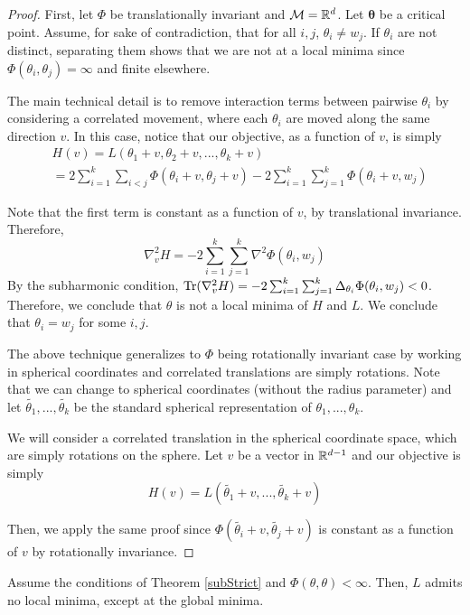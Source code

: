 \begin{proof}
First, let $\Phi$ be translationally invariant and $\mathcal{M} =
{\mathbb{R}}^d$. Let $\boldsymbol{\theta}$ be a critical point. Assume, for sake
of contradiction, that for all $i, j$, $\theta_i \neq w_j$. If
$\theta_i$ are not distinct, separating them shows that
we are not at a local minima since $\Phi(\theta_i,\theta_j) = \infty$
and finite elsewhere. 

The main technical detail is to remove interaction terms between
pairwise $\theta_i$ by considering a correlated movement, where each
$\theta_i$ are moved along the same direction $v$. In this case,
notice that our objective, as a function of $v$, is simply
\begin{align*}
& H(v) = L(\theta_1+ v, \theta_2 + v, ...,\theta_k + v) \\
& =  2\sum_{i=1}^k\sum_{i < j} \Phi(\theta_i+v,\theta_j+v) -
  2\sum_{i=1}^k\sum_{j=1}^k \Phi(\theta_i+v,w_j)
\end{align*}

Note that the first term is constant as a function of $v$, by
translational invariance. Therefore,
\[\nabla_{v}^2 H = -2\sum_{i=1}^k \sum_{j=1}^k \nabla^2\Phi(\theta_i, w_j)\]
By the subharmonic condition,
$\operatorname{Tr}(\nabla_{v}^2H) = -2\sum_{i=1}^k\sum_{j=1}^k
\Delta_{\theta_i}\Phi(\theta_i,w_j) < 0$.
Therefore, we conclude that $\theta$ is not a local minima of $H$ and
$L$.  We conclude that $\theta_i = w_j$ for some $i, j$.

The above technique generalizes to $\Phi$ being rotationally invariant
case by working in spherical coordinates and correlated translations
are simply rotations. Note that we can change to spherical coordinates
(without the radius parameter) and let
$\widetilde{\theta_1},...,\widetilde{\theta_{k}}$ be the standard
spherical representation of $\theta_1,...,\theta_k$.

We will consider a correlated translation in the spherical coordinate space, which are simply rotations on the sphere. Let $v$ be a vector in ${\mathbb{R}}^{d-1}$ and our objective is simply
\[ H(v) = L( \widetilde{\theta_1}+v,...,\widetilde{\theta_{k}} +v)\]

Then, we apply the same proof since $\Phi( \widetilde{\theta_i}+v, \widetilde{\theta_j}+v)$ is constant as a function of $v$ by rotationally invariance.
\end{proof}
%
\begin{corollary}
Assume the conditions of Theorem \ref{subStrict} and $\Phi(\theta,\theta) < \infty$. Then, $L$ admits no local minima, except at the global minima.
\end{corollary} 

